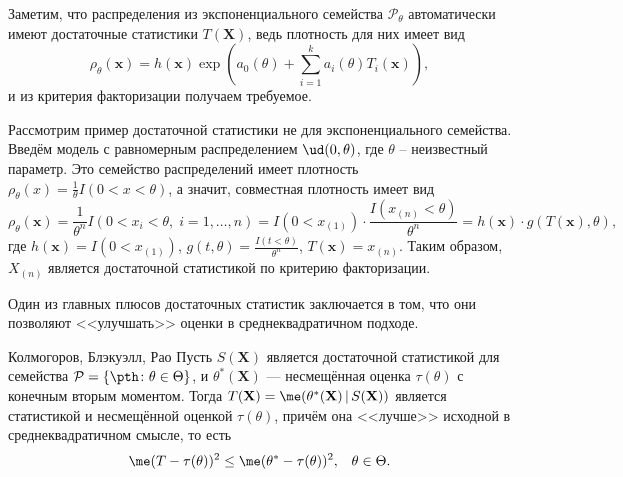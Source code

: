 Заметим, что распределения из экспоненциального семейства $\mathcal P_{\theta}$ автоматически имеют достаточные статистики $T(\mathbf X)$, ведь плотность для них имеет вид
\begin{equation}\label{exp}
    \rho_{\theta}(\mathbf{x}) = h(\mathbf{x}) \exp\left(a_0(\theta)+\sum_{i=1}^{k} a_i(\theta) T_i(\mathbf{x})\right),
\end{equation}
и из критерия факторизации получаем требуемое.

\begin{example}\label{suff_for_not_exp}
    Рассмотрим пример достаточной статистики не для экспоненциального семейства. Введём модель с равномерным распределением $\ud(0, \theta)$, где $\theta$ -- неизвестный параметр. Это семейство распределений имеет плотность $\rho_{\theta}(x) = \frac{1}{\theta} I(0 < x < \theta)$, а значит, совместная плотность имеет вид
    \[
    \rho_{\theta}(\mathbf x) = \frac{1}{\theta^n}I(0 < x_i < \theta,\; i = 1, \ldots, n) = I(0 < x_{(1)})\cdot\frac{I(x_{(n)} < \theta)}{\theta^n} = h(\mathbf x) \cdot g(T(\mathbf x), \theta),
    \]
    где $h(\mathbf x) = I(0 < x_{(1)})$, $g(t, \theta) = \frac{I(t < \theta)}{\theta^n}$, $T(\mathbf x) = x_{(n)}$. Таким образом, $X_{(n)}$ является достаточной статистикой по критерию факторизации.
\end{example}

Один из главных плюсов достаточных статистик заключается в том, что они позволяют <<улучшать>> оценки в среднеквадратичном подходе.

\begin{theorem}{Колмогоров, Блэкуэлл, Рао}{}
    Пусть $S(\mathbf X)$ является достаточной статистикой для семейства $\mathcal{P} = \{\pth\colon \theta \in \Theta\}$, и $\theta^*(\mathbf X)$ --- несмещённая оценка $\tau(\theta)$ с конечным вторым моментом. Тогда $T(\mathbf X) = \me(\theta^*(\mathbf X)\,|\,S(\mathbf X))$ является статистикой и несмещённой оценкой $\tau(\theta)$, причём она <<лучше>> исходной в среднеквадратичном смысле, то есть
    \[
    \me(T - \tau(\theta))^2 \le \me(\theta^* - \tau(\theta))^2,\;\;\;\theta \in \Theta.
    \]
\end{theorem}

